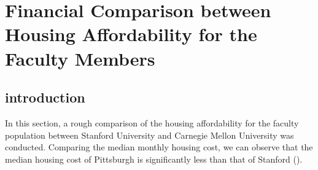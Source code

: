 
\chapter{Financial Comparison between Housing Affordability for the Faculty Members} %

\label{AppendixB} %

\section{introduction}
In this section, a rough comparison of the housing affordability for the faculty population between Stanford University and Carnegie Mellon University was conducted. Comparing the median monthly housing cost, we can observe that the median housing cost of Pittsburgh is significantly less than that of Stanford ().